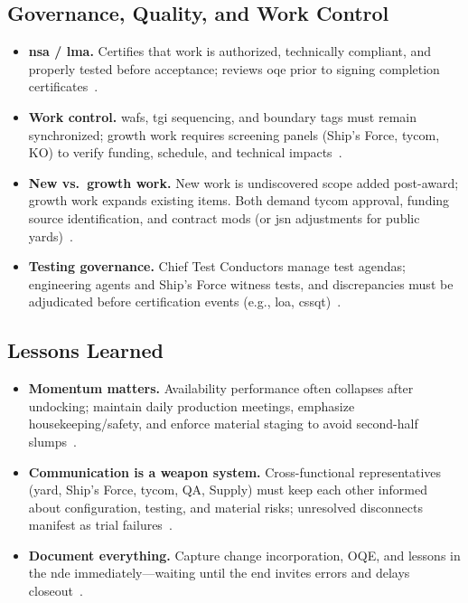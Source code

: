 \documentclass[../main.tex]{subfiles}
\begin{document}
\subsection{Governance, Quality, and Work Control}
\begin{itemize}
  \item \textbf{\ac{nsa} / \ac{lma}.} Certifies that work is authorized, technically compliant, and properly tested before acceptance; reviews \ac{oqe} prior to signing completion certificates~\autocite{COMFLTFORCOMINST4790-3}.
  \item \textbf{Work control.} \acp{waf}, \ac{tgi} sequencing, and boundary tags must remain synchronized; growth work requires screening panels (Ship's Force, \ac{tycom}, KO) to verify funding, schedule, and technical impacts~\autocite{edo-4-2-2-cno-availability-execution-2025}.
  \item \textbf{New vs.\ growth work.} New work is undiscovered scope added post-award; growth work expands existing items. Both demand \ac{tycom} approval, funding source identification, and contract mods (or \ac{jsn} adjustments for public yards)~\autocite{COMFLTFORCOMINST4790-3}.
  \item \textbf{Testing governance.} Chief Test Conductors manage test agendas; engineering agents and Ship's Force witness tests, and discrepancies must be adjudicated before certification events (e.g., \ac{loa}, \ac{cssqt})~\autocite{edo-4-2-2-cno-availability-execution-2025}.
\end{itemize}

\subsection{Lessons Learned}
\begin{itemize}
  \item \textbf{Momentum matters.} Availability performance often collapses after undocking; maintain daily production meetings, emphasize housekeeping/safety, and enforce material staging to avoid second-half slumps~\autocite{edo-4-2-2-cno-availability-execution-2025}.
  \item \textbf{Communication is a weapon system.} Cross-functional representatives (yard, Ship's Force, \ac{tycom}, QA, Supply) must keep each other informed about configuration, testing, and material risks; unresolved disconnects manifest as trial failures~\autocite{edo-4-2-2-cno-availability-execution-2025}.
  \item \textbf{Document everything.} Capture change incorporation, OQE, and lessons in the \ac{nde} immediately—waiting until the end invites errors and delays closeout~\autocite{COMFLTFORCOMINST4790-3}.
\end{itemize}

\end{document}
